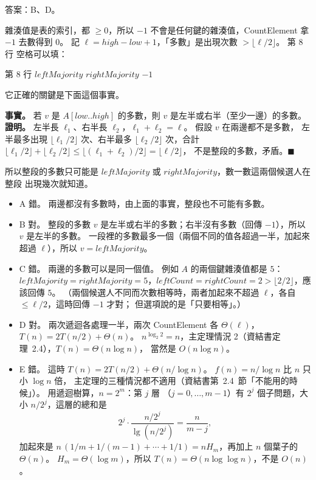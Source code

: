 \begin{pastsoln}
答案：B、D。

雜湊值是表的索引，都 $\ge 0$，所以 $-1$ 不會是任何鍵的雜湊值，CountElement 拿 $-1$ 去數得到 $0$。
記 $\ell = \mathit{high} - \mathit{low} + 1$，「多數」是出現次數 $> \lfloor \ell/2 \rfloor$。 第 8 行
空格可以填：
\begin{pseudo}[unbreakable]{第 8 行}
    \State \Return $\mathit{leftMajority}$
    \State \Return $\mathit{rightMajority}$
\Else
    \State \Return $-1$
\EndIf
\end{pseudo}
它正確的關鍵是下面這個事實。

\textbf{事實。} 若 $v$ 是 $A[\mathit{low}..\mathit{high}]$ 的多數，則 $v$ 是左半或右半（至少一邊）的多數。
\textbf{證明。} 左半長 $\ell_1$、右半長 $\ell_2$，$\ell_1 + \ell_2 = \ell$。 假設 $v$ 在兩邊都不是多數，
左半最多出現 $\lfloor \ell_1/2 \rfloor$ 次、右半最多 $\lfloor \ell_2/2 \rfloor$ 次，合計
$\lfloor \ell_1/2 \rfloor + \lfloor \ell_2/2 \rfloor \le \lfloor (\ell_1 + \ell_2)/2 \rfloor = \lfloor \ell/2 \rfloor$，
不是整段的多數，矛盾。\hfill$\blacksquare$

所以整段的多數只可能是 $\mathit{leftMajority}$ 或 $\mathit{rightMajority}$，數一數這兩個候選人在整段
出現幾次就知道。

\begin{itemize}
\item A 錯。 兩邊都沒有多數時，由上面的事實，整段也不可能有多數。
\item B 對。 整段的多數 $v$ 是左半或右半的多數；右半沒有多數（回傳 $-1$），所以 $v$ 是左半的多數。
一段裡的多數最多一個（兩個不同的值各超過一半，加起來超過 $\ell$），所以 $v = \mathit{leftMajority}$。
\item C 錯。 兩邊的多數可以是同一個值。 例如 $A$ 的兩個鍵雜湊值都是 $5$：$\mathit{leftMajority} =
\mathit{rightMajority} = 5$，$\mathit{leftCount} = \mathit{rightCount} = 2 > \lfloor 2/2 \rfloor$，應該回傳
$5$。 （兩個候選人不同而次數相等時，兩者加起來不超過 $\ell$，各自 $\le \ell/2$，這時回傳 $-1$ 才對；
但選項說的是「只要相等」。）
\item D 對。 兩次遞迴各處理一半，兩次 CountElement 各 $\Theta(\ell)$，
$T(n) = 2T(n/2) + \Theta(n)$。 $n^{\log_2 2} = n$，主定理情況 2（資結書定理~2.4），$T(n) = \Theta(n \log n)$，
當然是 $O(n \log n)$。
\item E 錯。 這時 $T(n) = 2T(n/2) + \Theta(n/\log n)$。 $f(n) = n/\log n$ 比 $n$ 只小 $\log n$ 倍，
主定理的三種情況都不適用（資結書第~2.4~節「不能用的時候」）。 用遞迴樹算，$n = 2^m$：第 $j$ 層
（$j = 0, \ldots, m - 1$）有 $2^j$ 個子問題，大小 $n/2^j$，這層的總和是
\[
2^j \cdot \frac{n/2^j}{\lg (n/2^j)} = \frac{n}{m - j},
\]
加起來是 $n\,(1/m + 1/(m-1) + \cdots + 1/1) = n H_m$，再加上 $n$ 個葉子的 $\Theta(n)$。
$H_m = \Theta(\log m)$，所以 $T(n) = \Theta(n \log \log n)$，不是 $O(n)$。
\end{itemize}
\end{pastsoln}
